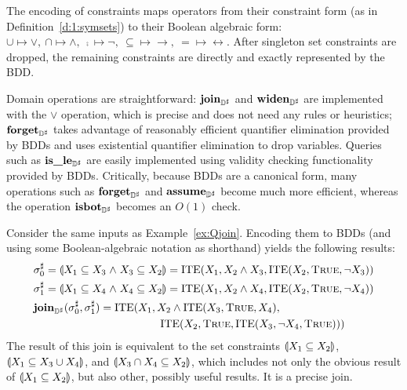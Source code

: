 The encoding of constraints maps operators from their constraint form (as in Definition~\ref{d:1:symsets}) to their Boolean algebraic form: $\cup \mapsto \vee, \ \cap \mapsto \wedge, \ \comp{} \mapsto \neg, \ \subseteq \mapsto \rightarrow, \ = \mapsto \leftrightarrow$. After singleton set constraints are dropped, the remaining constraints are directly and exactly represented by the BDD.  

Domain operations are straightforward: $\textbf{join}_{{\mathbb{D}}^{\sharp}}$ and $\textbf{widen}_{{\mathbb{D}}^{\sharp}}$ are implemented with the $\vee$ operation, which is precise and does not need any rules or heuristics; $\textbf{forget}_{{\mathbb{D}}^{\sharp}}$ takes advantage of reasonably efficient quantifier elimination provided by BDDs and uses existential quantifier elimination to drop variables.  Queries such as $\textbf{is\_le}_{{\mathbb{D}}^{\sharp}}$ are easily implemented using validity checking functionality provided by BDDs.  Critically, because BDDs are a canonical form, many operations such as $\textbf{forget}_{{\mathbb{D}}^{\sharp}}$ and $\textbf{assume}_{{\mathbb{D}}^{\sharp}}$ become much more efficient, whereas the operation $\textbf{isbot}_{{\mathbb{D}}^{\sharp}}$ becomes an $O(1)$ check.

\begin{example}  Consider the same inputs as Example~\ref{ex:Qjoin}.  Encoding them to BDDs (and using some Boolean-algebraic notation as shorthand) yields the following results:
\begin{align*}
  & {\sigma}^{\sharp}_0 = \llparenthesis X_1 \subseteq X_3 \mathrel{\wedge} X_3 \subseteq X_2 \rrparenthesis =
  \textrm{ITE}(X_1, X_2 \wedge X_3, \textrm{ITE}(X_2, \textsc{True},
  \neg X_3))
  \\
  & {\sigma}^{\sharp}_1 = \llparenthesis X_1 \subseteq X_4 \mathrel{\wedge} X_4 \subseteq X_2 \rrparenthesis =
  \textrm{ITE}(X_1, X_2 \wedge X_4, \textrm{ITE}(X_2, \textsc{True},
  \neg X_4))
  \\
  & \textbf{join}_{{\mathbb{D}}^{\sharp}}({\sigma}^{\sharp}_0, {\sigma}^{\sharp}_1 ) =
  \textrm{ITE}(X_1, X_2 \wedge \textrm{ITE}(X_3, \textsc{True}, X_4),
  \\
  & \qquad \qquad \qquad \qquad \qquad \quad \;\;
  \textrm{ITE}(X_2, \textsc{True}, \textrm{ITE}(X_3, \neg X_4, \textsc{True})))
\end{align*}
  The result of this join is equivalent to the set constraints $\llparenthesis X_1 \subseteq X_2 \rrparenthesis$, $\llparenthesis X_1 \subseteq X_3 \cup X_4 \rrparenthesis$, and $\llparenthesis X_3 \cap X_4 \subseteq X_2 \rrparenthesis$, which includes not only the obvious result of $\llparenthesis X_1 \subseteq X_2 \rrparenthesis$, but also other, possibly useful results.  It is a precise join.
\end{example}

